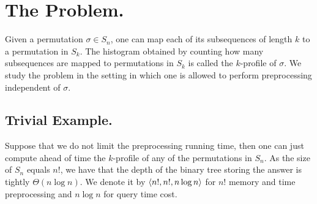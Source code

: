\documentclass[manuscript,screen,review]{acmart}
\begin{document}
%
%
%
%
%

\section{The Problem.} Given a permutation $\sigma \in S_{n}$, one can map each of its subsequences of length $k$ to a permutation in $S_{k}$. The histogram obtained by counting how many subsequences are mapped to permutations in $S_{k}$ is called the $k$-profile of $\sigma$. We study the problem in the setting in which one is allowed to perform preprocessing independent of $\sigma$.        

\subsection{Trivial Example.} Suppose that we do not limit the preprocessing running time, then one can just compute ahead of time the $k$-profile of any of the permutations in $S_{n}$. As the size of $S_{n}$ equals $n!$, we have that the depth of the binary tree storing the answer is tightly $\Theta(n\log n)$. We denote it by $\braket{n!,n!,n \log n}$ for $n!$ memory and time preprocessing and $n \log n$ for query time cost.
\end{document}

